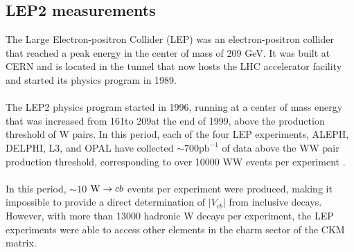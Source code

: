 \subsection{LEP2 measurements}
The Large Electron-positron Collider (LEP) was an electron-positron collider that reached a peak energy in the center of mass of 209 GeV. It was built at CERN and is located in the tunnel that now hosts the LHC accelerator facility and started its physics program in 1989.\\
\\
The LEP2 physics program started in 1996, running at a center of mass energy that was increased from 161\GeV to 209\GeV at the end of 1999, above the production threshold of W pairs. 
In this period, each of the four LEP experiments, ALEPH, DELPHI, L3, and OPAL have collected  $\sim700 \text{pb}^{-1}$ of data above the WW pair production threshold, corresponding to over 10000 WW events per experiment \cite{Lu2008WLEP}.\\
\\
In this period, $\sim 10$ ${\text{W}} \to cb$ events per experiment were produced, making it impossible to provide a direct determination of $|V_{cb}|$ from inclusive \PW decays.\\
However, with more than 13000 hadronic W decays per experiment, the LEP experiments were able to access other elements in the charm sector of the CKM matrix.


